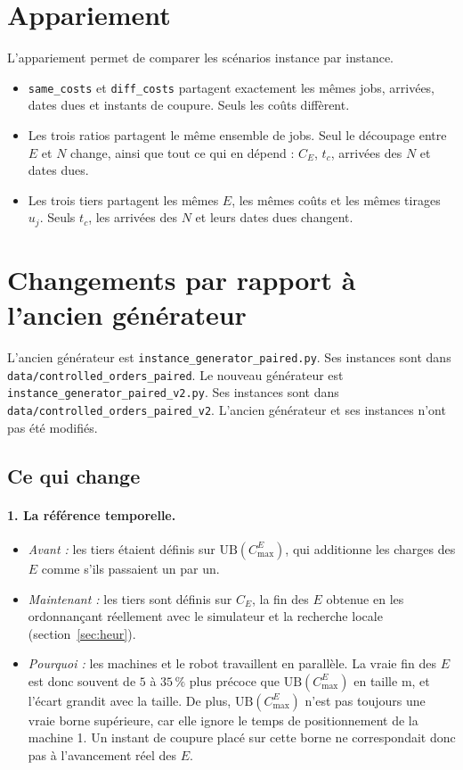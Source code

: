 \documentclass[11pt,a4paper]{article}
\newcommand{\UB}{\mathrm{UB}}
\newcommand{\CE}{C_E}
\begin{document}
\section{Appariement}

L'appariement permet de comparer les scénarios instance par instance.
\begin{itemize}
  \item \texttt{same\_costs} et \texttt{diff\_costs} partagent exactement les mêmes jobs, arrivées, dates dues et instants de coupure. Seuls les coûts diffèrent.
  \item Les trois ratios partagent le même ensemble de jobs. Seul le découpage entre $E$ et $N$ change, ainsi que tout ce qui en dépend : $\CE$, $t_c$, arrivées des $N$ et dates dues.
  \item Les trois tiers partagent les mêmes $E$, les mêmes coûts et les mêmes tirages $u_j$. Seuls $t_c$, les arrivées des $N$ et leurs dates dues changent.
\end{itemize}

\section{Changements par rapport à l'ancien générateur}
\label{sec:changes}

L'ancien générateur est \texttt{instance\_generator\_paired.py}. Ses instances sont dans \texttt{data/controlled\_orders\_paired}.
Le nouveau générateur est \texttt{instance\_generator\_paired\_v2.py}. Ses instances sont dans \texttt{data/controlled\_orders\_paired\_v2}.
L'ancien générateur et ses instances n'ont pas été modifiés.

\subsection{Ce qui change}

\paragraph{1. La référence temporelle.}
\begin{itemize}
  \item \emph{Avant :} les tiers étaient définis sur $\UB(C^E_{\max})$, qui additionne les charges des $E$ comme s'ils passaient un par un.
  \item \emph{Maintenant :} les tiers sont définis sur $\CE$, la fin des $E$ obtenue en les ordonnançant réellement avec le simulateur et la recherche locale (section~\ref{sec:heur}).
  \item \emph{Pourquoi :} les machines et le robot travaillent en parallèle. La vraie fin des $E$ est donc souvent de $5$ à $35\,\%$ plus précoce que $\UB(C^E_{\max})$ en taille m, et l'écart grandit avec la taille. De plus, $\UB(C^E_{\max})$ n'est pas toujours une vraie borne supérieure, car elle ignore le temps de positionnement de la machine 1. Un instant de coupure placé sur cette borne ne correspondait donc pas à l'avancement réel des $E$.
\end{itemize}
\end{document}
